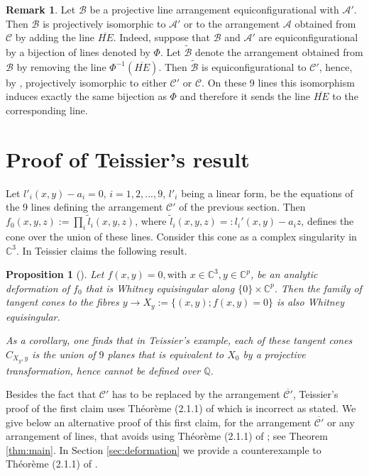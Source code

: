 \documentclass[12pt]{amsart}
\newtheorem{proposition}[theorem]{Proposition}
\theoremstyle{definition}
\newtheorem{remark}[theorem]{Remark}
\numberwithin{equation}{section}
\newcommand{\Q}{\mathbb{Q}}
\newcommand{\C}{\mathbb{C}}
\newcommand{\A}{\mathcal{A}}
\newcommand{\Car}{\mathcal{C}}
\begin{document}
\begin{remark}
Let $\mathcal B$ be a projective line arrangement equiconfigurational with $\A'$.  Then $\mathcal B$ is projectively isomorphic to $\A'$ or to  the arrangement $\A$ obtained from $\Car$ by adding the line $\overline{HE}$.  Indeed, suppose that $\mathcal B$ and $\A'$ are equiconfigurational by a bijection of lines denoted by $\Phi$. Let 
$\tilde {\mathcal B}$ denote the arrangement obtained from $\mathcal B$ by removing the line $\Phi^{-1}(\overline{HE})$.  Then $\tilde {\mathcal B}$ is equiconfigurational to $\Car'$, hence, by \cite[Theorem 2.28]{Grunpaper}, projectively isomorphic to 
either $\Car'$ or $\Car$.  On these 9 lines this isomorphism induces exactly the same bijection as $\Phi$ and therefore it sends the line $\overline{HE}$ to the corresponding line.  
\end{remark}


\section{Proof of Teissier's result}\label{sec:proof}

Let $l'_i (x,y) -a_i=0$, $i=1,2,. . . , 9$, $l'_i$ being a linear form, be the equations of the 9 lines defining the arrangement $\mathcal C'$ of the previous section.  Then $f_0(x,y,z):= \prod_i \tilde l_i(x,y,z)$, where $\tilde l_i(x,y,z)=: l_i'(x,y) -a_i z$, defines the cone over the union of these lines. Consider this cone as a complex singularity in $\C^3$. In \cite{Te90}  Teissier claims the following result.   

\begin{proposition} [\cite{Te90}]\label{pr:teissier}
Let $f(x,y)=0, \text{with}\,\, x\in \C^3, y\in \C^p$, be an analytic deformation of $f_0$ that is Whitney equisingular along $\{0\}\times \C^p$.  Then the family of tangent cones to the fibres $y\to X_y:=\{(x,y); f(x,y)=0\}$ is also Whitney equisingular.  

As a corollary,  one finds that in Teissier's example, each of these tangent cones $C_{X_y,y}$ is the union of $9$ planes that is equivalent to $X_0$ by a projective transformation, hence cannot be defined over $\Q$.  
\end{proposition}

Besides the fact that $\mathcal C'$ has to be replaced by the arrangement $\overline {\mathcal C'}$, 
Teissier's proof of the first claim uses 
Théorème (2.1.1) 
of \cite{LT79} which is incorrect as stated.  We give below an alternative proof of this first claim, for the arrangement $\overline {\mathcal C'}$ or any arrangement of lines, that avoids using Théorème (2.1.1) of \cite{LT79}; see Theorem \ref{thm:main}.  In Section \ref{sec:deformation} we provide a counterexample to 
Théorème (2.1.1) of \cite{LT79}.  
\end{document}
